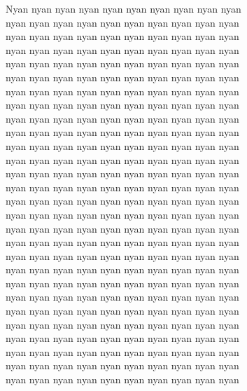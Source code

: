 \vspace{10pt}
Nyan nyan nyan nyan nyan nyan nyan nyan nyan nyan\\
nyan nyan nyan nyan nyan nyan nyan nyan nyan nyan\\
nyan nyan nyan nyan nyan nyan nyan nyan nyan nyan\\
nyan nyan nyan nyan nyan nyan nyan nyan nyan nyan\\
nyan nyan nyan nyan nyan nyan nyan nyan nyan nyan\\
nyan nyan nyan nyan nyan nyan nyan nyan nyan nyan\\
nyan nyan nyan nyan nyan nyan nyan nyan nyan nyan\\
nyan nyan nyan nyan nyan nyan nyan nyan nyan nyan\\
nyan nyan nyan nyan nyan nyan nyan nyan nyan nyan\\
nyan nyan nyan nyan nyan nyan nyan nyan nyan nyan\\
nyan nyan nyan nyan nyan nyan nyan nyan nyan nyan\\
nyan nyan nyan nyan nyan nyan nyan nyan nyan nyan\\
nyan nyan nyan nyan nyan nyan nyan nyan nyan nyan\\
nyan nyan nyan nyan nyan nyan nyan nyan nyan nyan\\
nyan nyan nyan nyan nyan nyan nyan nyan nyan nyan\\
nyan nyan nyan nyan nyan nyan nyan nyan nyan nyan\\
nyan nyan nyan nyan nyan nyan nyan nyan nyan nyan\\
nyan nyan nyan nyan nyan nyan nyan nyan nyan nyan\\
nyan nyan nyan nyan nyan nyan nyan nyan nyan nyan\\
nyan nyan nyan nyan nyan nyan nyan nyan nyan nyan\\
nyan nyan nyan nyan nyan nyan nyan nyan nyan nyan\\
nyan nyan nyan nyan nyan nyan nyan nyan nyan nyan\\
nyan nyan nyan nyan nyan nyan nyan nyan nyan nyan\\
nyan nyan nyan nyan nyan nyan nyan nyan nyan nyan\\
nyan nyan nyan nyan nyan nyan nyan nyan nyan nyan\\
nyan nyan nyan nyan nyan nyan nyan nyan nyan nyan\\
nyan nyan nyan nyan nyan nyan nyan nyan nyan nyan\\
nyan nyan nyan nyan nyan nyan nyan nyan nyan nyan
